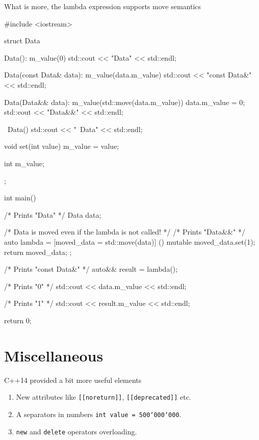 \documentclass[../main]{subfiles}
\begin{document}
    What is more, the lambda expression supports move semantics
\begin{Code}
    #include <iostream>
    
    struct Data
    {
        Data(): m_value(0)
        {
            std::cout << "Data" << std::endl;
        }
        
        Data(const Data& data): m_value(data.m_value)
        {
            std::cout << "const Data&" << std::endl;
        }
        
        Data(Data&& data): m_value(std::move(data.m_value))
        {
            data.m_value = 0;
            std::cout << "Data&&" << std::endl;
        }
        
        ~Data()
        {
            std::cout << "~Data" << std::endl;
        }
        
        void set(int value)
        {
            m_value = value;
        }
        
        int m_value;
    };
    
    int main()
    {
        /* Prints "Data" */
        Data data;
        
        /* Data is moved even if the lambda is not called! */
        /* Prints "Data&&" */
        auto lambda = [moved_data = std::move(data)] () mutable
        {
            moved_data.set(1);
            return moved_data;
        };
        
        /* Prints "const Data&" */
        auto&& result = lambda();
        
        /* Prints "0" */
        std::cout << data.m_value << std::endl;
        
        /* Prints "1" */
        std::cout << result.m_value << std::endl;
        
        return 0;
    }
\end{Code}

\section{Miscellaneous}
    C++14 provided a bit more useful elements
\begin{enumerate}
    \item New attributes like \texttt{[[noreturn]]}, \texttt{[[deprecated]]} etc.
    \item A separators in numbers \texttt{int value = 500`000`000}.
    \item \texttt{new} and \texttt{delete} operators overloading.
\end{enumerate}
\end{document}
